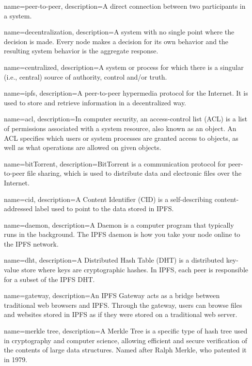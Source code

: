  {
	name=peer-to-peer,
	description={A direct connection between two participants in a system.}
}

 {
	name=decentralization,
	description={A system with no single point where the decision is made. Every node makes a decision for its own behavior and the resulting system behavior is the aggregate response.}
}

 {
	name=centralized,
	description={A system or process for which there is a singular (i.e., central) source of authority, control and/or truth.}
}


 {
	name=ipfs,
	description={A peer-to-peer hypermedia protocol for the Internet. It is used to store and retrieve information in a decentralized way.}
}

 {
	name=acl,
	description={In computer security, an access-control list (ACL) is a list of permissions associated with a system resource, also known as an object. An ACL specifies which users or system processes are granted access to objects, as well as what operations are allowed on given objects.}
}

 {
	name=bitTorrent,
	description={BitTorrent is a communication protocol for peer-to-peer file sharing, which is used to distribute data and electronic files over the Internet.}
}

 {
	name=cid,
	description={A Content Identifier (CID) is a self-describing content-addressed label used to point to the data stored in IPFS.}
}

 {
	name=daemon,
	description={A Daemon is a computer program that typically runs in the background. The IPFS daemon is how you take your node online to the IPFS network.}
}

 {
	name=dht,
	description={A Distributed Hash Table (DHT) is a distributed key-value store where keys are cryptographic hashes. In IPFS, each peer is responsible for a subset of the IPFS DHT.}
}

 {
	name=gateway,
	description={An IPFS Gateway acts as a bridge between traditional web browsers and IPFS. Through the gateway, users can browse files and websites stored in IPFS as if they were stored on a traditional web server.}
}

 {
	name=merkle tree,
	description={A Merkle Tree is a specific type of hash tree used in cryptography and computer science, allowing efficient and secure verification of the contents of large data structures. Named after Ralph Merkle, who patented it in 1979.}
}
